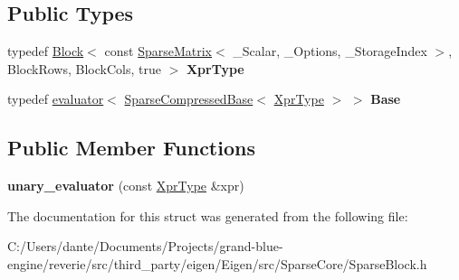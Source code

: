 \subsection*{Public Types}
\begin{DoxyCompactItemize}
\item 
\mbox{\label{struct_eigen_1_1internal_1_1unary__evaluator_3_01_block_3_01const_01_sparse_matrix_3_01___scalarcdbc8f3eebef46901de7cc88abb0e702_a4939bb3038a79dda336e642379b351b2}} 
typedef \mbox{\hyperlink{class_eigen_1_1_block}{Block}}$<$ const \mbox{\hyperlink{class_eigen_1_1_sparse_matrix}{Sparse\+Matrix}}$<$ \+\_\+\+Scalar, \+\_\+\+Options, \+\_\+\+Storage\+Index $>$, Block\+Rows, Block\+Cols, true $>$ {\bfseries Xpr\+Type}
\item 
\mbox{\label{struct_eigen_1_1internal_1_1unary__evaluator_3_01_block_3_01const_01_sparse_matrix_3_01___scalarcdbc8f3eebef46901de7cc88abb0e702_aa27e22ab882b25066597f37457d6dab1}} 
typedef \mbox{\hyperlink{struct_eigen_1_1internal_1_1evaluator}{evaluator}}$<$ \mbox{\hyperlink{class_eigen_1_1_sparse_compressed_base}{Sparse\+Compressed\+Base}}$<$ \mbox{\hyperlink{class_eigen_1_1_block}{Xpr\+Type}} $>$ $>$ {\bfseries Base}
\end{DoxyCompactItemize}
\subsection*{Public Member Functions}
\begin{DoxyCompactItemize}
\item 
\mbox{\label{struct_eigen_1_1internal_1_1unary__evaluator_3_01_block_3_01const_01_sparse_matrix_3_01___scalarcdbc8f3eebef46901de7cc88abb0e702_a185bbd4feda5782880d651cba8fa199c}} 
{\bfseries unary\+\_\+evaluator} (const \mbox{\hyperlink{class_eigen_1_1_block}{Xpr\+Type}} \&xpr)
\end{DoxyCompactItemize}


The documentation for this struct was generated from the following file\+:\begin{DoxyCompactItemize}
\item 
C\+:/\+Users/dante/\+Documents/\+Projects/grand-\/blue-\/engine/reverie/src/third\+\_\+party/eigen/\+Eigen/src/\+Sparse\+Core/Sparse\+Block.\+h\end{DoxyCompactItemize}
